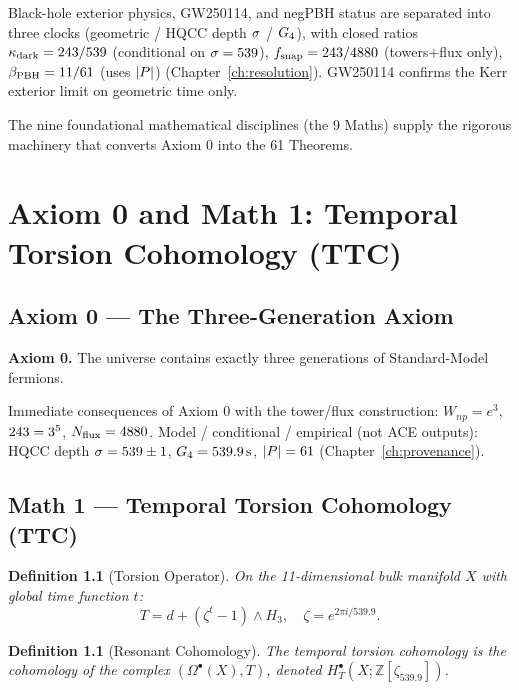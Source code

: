 \documentclass[11pt,a4paper]{book}
\newtheorem{definition}[theorem]{Definition}
\theoremstyle{remark}
\theoremstyle{definition}
\begin{document}
Black-hole exterior physics, GW250114, and negPBH status are separated into three clocks (geometric / HQCC depth \(\sigma\) / \(G_{4}\)), with closed ratios
\(\kappa_{\rm dark}=243/539\) (conditional on \(\sigma=539\)),
\(f_{\rm snap}=243/4880\) (towers+flux only),
\(\beta_{\rm PBH}=11/61\) (uses \(|P|\))
(Chapter~\ref{ch:resolution}). GW250114 confirms the Kerr exterior limit on geometric time only.

The nine foundational mathematical disciplines (the 9 Maths) supply the rigorous machinery that converts Axiom 0 into the 61 Theorems.

\PrintProvenanceChapter



\chapter{Axiom 0 and Math 1: Temporal Torsion Cohomology (TTC)}

\section{Axiom 0 — The Three-Generation Axiom}

\textbf{Axiom 0.} The universe contains exactly three generations of Standard-Model fermions.

Immediate consequences of Axiom 0 with the tower/flux construction: \(W_{np}=e^3\), \(243=3^5\), \(N_{\mathrm{flux}}=4880\).
Model / conditional / empirical (not ACE outputs): HQCC depth \(\sigma=539\pm 1\), \(G_{4}=539.9\,\mathrm{s}\), \(|P|=61\) (Chapter~\ref{ch:provenance}).

\section{Math 1 — Temporal Torsion Cohomology (TTC)}

\begin{definition}[Torsion Operator]
On the 11-dimensional bulk manifold \(X\) with global time function \(t\):
\[ T = d + (\zeta^t - 1) \wedge H_3, \quad \zeta = e^{2\pi i / 539.9}. \]
\end{definition}

\begin{definition}[Resonant Cohomology]
The temporal torsion cohomology is the cohomology of the complex \((\Omega^\bullet(X), T)\), denoted \(H_T^\bullet(X; \mathbb{Z}[\zeta_{539.9}])\).
\end{definition}
\end{document}
